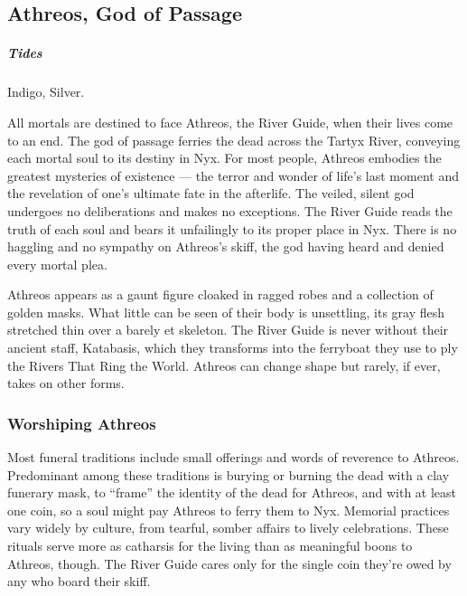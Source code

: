\subsection*{Athreos, God of Passage} \label{ssec::athreos}
    \subparagraph{Tides} Indigo, Silver.

    All mortals are destined to face Athreos, the River Guide, when their lives come to an end.
    The god of passage ferries the dead across the Tartyx River, conveying each mortal soul to its destiny in Nyx.
    For most people, Athreos embodies the greatest mysteries of existence --- the terror and wonder of life's last moment and the revelation of one's ultimate fate in the afterlife.
    The veiled, silent god undergoes no deliberations and makes no exceptions.
    The River Guide reads the truth of each soul and bears it unfailingly to its proper place in Nyx.
    There is no haggling and no sympathy on Athreos's skiff, the god having heard and denied every mortal plea.

    Athreos appears as a gaunt figure cloaked in ragged robes and a collection of golden masks.
    What little can be seen of their body is unsettling, its gray flesh stretched thin over a barely et skeleton.
    The River Guide is never without their ancient staff, Katabasis, which they transforms into the ferryboat they use to ply the Rivers That Ring the World.
    Athreos can change shape but rarely, if ever, takes on other forms.


    \subsubsection{Worshiping Athreos}
        Most funeral traditions include small offerings and words of reverence to Athreos.
        Predominant among these traditions is burying or burning the dead with a clay funerary mask, to ``frame'' the identity of the dead for Athreos, and with at least one coin, so a soul might pay Athreos to ferry them to Nyx.
        Memorial practices vary widely by culture, from tearful, somber affairs to lively celebrations.
        These rituals serve more as catharsis for the living than as meaningful boons to Athreos, though.
        The River Guide cares only for the single coin they're owed by any who board their skiff.

